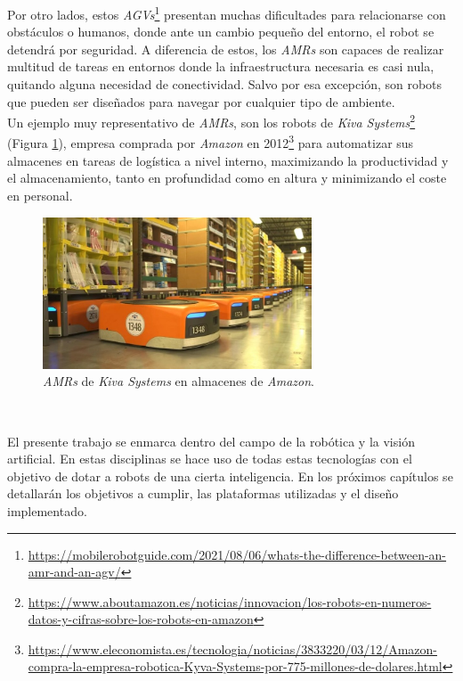 Por otro lados, estos \textit{AGVs}\footnote{\url{https://mobilerobotguide.com/2021/08/06/whats-the-difference-between-an-amr-and-an-agv/}} presentan muchas dificultades para relacionarse con obstáculos o humanos, donde ante un cambio pequeño del entorno, el robot se detendrá por seguridad. A diferencia de estos, los \textit{AMRs} son capaces de realizar multitud de tareas en entornos donde la infraestructura necesaria es casi nula, quitando alguna necesidad de conectividad. Salvo por esa excepción, son robots que pueden ser diseñados para navegar por cualquier tipo de ambiente.\\

Un ejemplo muy representativo de \textit{AMRs}, son los robots de \textit{Kiva Systems}\footnote{\url{https://www.aboutamazon.es/noticias/innovacion/los-robots-en-numeros-datos-y-cifras-sobre-los-robots-en-amazon}} (Figura \ref{fig:kivasystems}), empresa comprada por \textit{Amazon} en 2012\footnote{\url{https://www.eleconomista.es/tecnologia/noticias/3833220/03/12/Amazon-compra-la-empresa-robotica-Kyva-Systems-por-775-millones-de-dolares.html}} para automatizar sus almacenes en tareas de logística a nivel interno, maximizando la productividad y el almacenamiento, tanto en profundidad como en altura y minimizando el coste en personal.\\

\begin{figure} [h!]
	\begin{center}
		\includegraphics[width=8cm]{figs/kivasystems}
	\end{center}
	\caption{\textit{AMRs} de \textit{Kiva Systems} en almacenes de \textit{Amazon}.}
	\label{fig:kivasystems}
\end{figure}\

El presente trabajo se enmarca dentro del campo de la robótica y la visión artificial. En estas disciplinas se hace uso de todas estas tecnologías con el objetivo de dotar a robots de una cierta inteligencia. En los próximos capítulos se detallarán los objetivos a cumplir, las plataformas utilizadas y el diseño implementado.